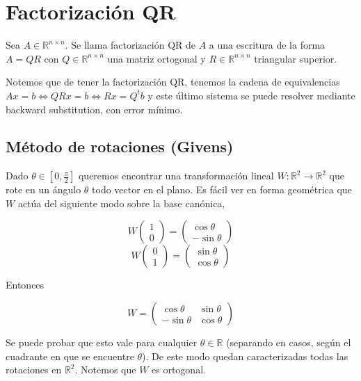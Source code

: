 \section{Factorización QR}

\begin{defi}
Sea $A \in \mathbb{R}^{n \times n}$. Se llama factorización QR de $A$ a una escritura de la forma $A = QR$ con $Q \in \mathbb{R}^{n \times n}$ una matriz ortogonal y $R \in \mathbb{R}^{n \times n}$ triangular superior.
\end{defi}

Notemos que de tener la factorización QR, tenemos la cadena de equivalencias $Ax = b \Leftrightarrow QR x = b \Leftrightarrow Rx = Q^t b$ y este último sistema se puede resolver mediante backward substitution, con error mínimo.

\subsection{Método de rotaciones (Givens)}

Dado $\theta \in [0, \frac{\pi}{2}]$ queremos encontrar una transformación lineal $W : \mathbb{R}^2 \to \mathbb{R}^2$ que rote en un ángulo $\theta$ todo vector en el plano. Es fácil ver en forma geométrica que $W$ actúa del siguiente modo sobre la base canónica,

\[W\begin{pmatrix}1 \\ 0\end{pmatrix} = \begin{pmatrix}\cos\theta \\ -\sin \theta\end{pmatrix}\]
\[W\begin{pmatrix}0 \\ 1\end{pmatrix} = \begin{pmatrix}\sin\theta \\ \cos \theta\end{pmatrix}\]

Entonces

\[W = \begin{pmatrix}
\cos \theta & \sin \theta \\
-\sin \theta & \cos \theta
\end{pmatrix}\]

Se puede probar que esto vale para cualquier $\theta \in \mathbb{R}$ (separando en casos, según el cuadrante en que se encuentre $\theta$). De este modo quedan caracterizadas todas las rotaciones en $\mathbb{R}^2$. Notemos que $W$ es ortogonal.

